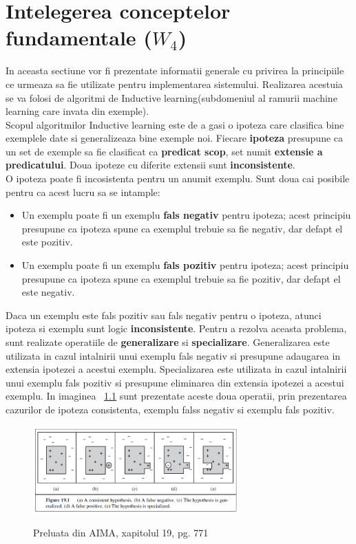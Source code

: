 \documentclass[a4paper,12pt]{report}
\begin{document}
\chapter{Intelegerea conceptelor fundamentale ($W_4$)}
	In aceasta sectiune vor fi prezentate informatii generale cu privirea la principiile ce urmeaza sa fie utilizate pentru implementarea sistemului. Realizarea acestuia se va folosi de algoritmi de Inductive learning(subdomeniul al ramurii machine learning care invata din exemple).\\
	Scopul algoritmilor Inductive learning este de a gasi o ipoteza care clasifica bine exemplele date si generalizeaza bine exemple noi. Fiecare \textbf{ipoteza} presupune ca un set de exemple sa fie clasificat ca \textbf{predicat scop}, set numit \textbf{extensie a predicatului}. Doua ipoteze cu diferite extensii sunt \textbf{inconsistente}.\\
	O ipoteza poate fi incosistenta pentru un anumit exemplu. Sunt doua cai posibile pentru ca acest lucru sa se intample:
\begin{itemize}
\item Un exemplu poate fi un exemplu \textbf{fals negativ} pentru ipoteza; acest principiu presupune ca ipoteza spune ca exemplul trebuie sa fie negativ, dar defapt el este pozitiv.
\item Un exemplu poate fi un exemplu \textbf{fals pozitiv} pentru ipoteza; acest principiu presupune ca ipoteza spune ca exemplul trebuie sa fie pozitiv, dar defapt el este negativ.
\end{itemize}
	Daca un exemplu este fals pozitiv sau fals negativ pentru o ipoteza, atunci ipoteza si exemplu sunt logic \textbf{inconsistente}. Pentru a rezolva aceasta problema, sunt realizate operatiile de \textbf{generalizare} si \textbf{specializare}. Generalizarea este utilizata in cazul intalnirii unui exemplu fals negativ si presupune adaugarea in extensia ipotezei a acestui exemplu. Specializarea este utilizata in cazul intalnirii unui exemplu fals pozitiv si presupune eliminarea din extensia ipotezei a acestui exemplu. In imaginea ~\ref{fig:img6} sunt prezentate aceste doua operatii, prin prezentarea cazurilor de ipoteza consistenta, exemplu falss negativ si exemplu fals pozitiv. 
	
\begin{figure}[h]
			\centering
			\caption{Preluata din AIMA, xapitolul 19, pg. 771}
			\label{fig:img6}
			\includegraphics[width=0.7\textwidth]{fig/img6}\\
\end{figure}
\end{document}
